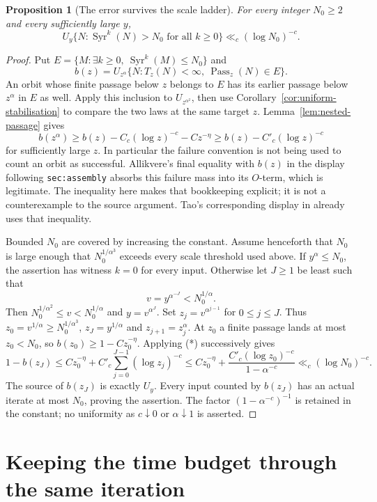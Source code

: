 \documentclass[11pt]{article}
\newtheorem{proposition}{Proposition}
\theoremstyle{remark}\newtheorem{remark}[proposition]{Remark}
\newcommand{\Syr}{\operatorname{Syr}}
\begin{document}
\begin{proposition}[The error survives the scale ladder]
\label{prop:untimed-ladder}
For every integer $N_0\ge2$ and every sufficiently large $y$,
\[
 U_y\{N:\Syr^k(N)>N_0\text{ for all }k\ge0\}
 \ll_c(\log N_0)^{-c}.
\]
\end{proposition}
\begin{proof}
Put $E=\{M:\exists k\ge0,\ \Syr^k(M)\le N_0\}$ and
\[
 b(z)=U_{z^\alpha}
 \{N:T_z(N)<\infty,\ \operatorname{Pass}_z(N)\in E\}.
\]
An orbit whose finite passage below $z$ belongs to $E$ has its
earlier passage below $z^\alpha$ in $E$ as well. Apply this inclusion
to $U_{z^{\alpha^2}}$, then use
Corollary~\ref{cor:uniform-stabilisation} to compare the two laws
at the same target $z$. Lemma~\ref{lem:nested-passage} gives
\[
 b(z^\alpha)\ge b(z)-C_c(\log z)^{-c}-Cz^{-\eta}
              \ge b(z)-C'_c(\log z)^{-c}                 \tag{*}
\]
for sufficiently large $z$. In particular the failure convention is
not being used to count an orbit as successful. Allikvere's final
equality with $b(z)$ in the display following \texttt{sec:assembly}
absorbs this failure mass into its $O$-term, which is legitimate.
The inequality here makes that bookkeeping explicit; it is not a
counterexample to the source argument. Tao's corresponding display in
\cite[\S3]{Tao7} already uses that inequality.

Bounded $N_0$ are covered by increasing the constant. Assume henceforth
that $N_0$ is large enough that $N_0^{1/\alpha^3}$ exceeds every scale
threshold used above. If $y^\alpha\le N_0$, the assertion has witness
$k=0$ for every input. Otherwise let $J\ge1$ be least such that
\[
 v=y^{\alpha^{-J}}<N_0^{1/\alpha}.
\]
Then $N_0^{1/\alpha^2}\le v<N_0^{1/\alpha}$ and
$y=v^{\alpha^J}$. Set $z_j=v^{\alpha^{j-1}}$ for $0\le j\le J$.
Thus $z_0=v^{1/\alpha}\ge N_0^{1/\alpha^3}$,
$z_J=y^{1/\alpha}$ and $z_{j+1}=z_j^\alpha$.
At $z_0$ a finite passage lands at most $z_0<N_0$, so
$b(z_0)\ge1-Cz_0^{-\eta}$. Applying (*) successively gives
\[
 1-b(z_J)\le Cz_0^{-\eta}
   +C'_c\sum_{j=0}^{J-1}(\log z_j)^{-c}
 \le Cz_0^{-\eta}
   +\frac{C'_c(\log z_0)^{-c}}{1-\alpha^{-c}}
 \ll_c(\log N_0)^{-c}.
\]
The source of $b(z_J)$ is exactly $U_y$. Every input counted by $b(z_J)$
has an actual iterate at most $N_0$, proving the assertion.
The factor $(1-\alpha^{-c})^{-1}$ is retained in the constant; no
uniformity as $c\downarrow0$ or $\alpha\downarrow1$ is asserted.
\end{proof}

\section{Keeping the time budget through the same iteration}
\end{document}
